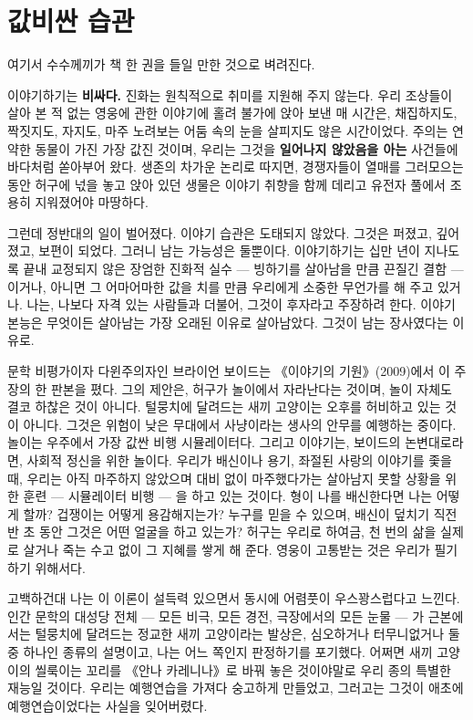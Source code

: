 \section*{값비싼 습관}

여기서 수수께끼가 책 한 권을 들일 만한 것으로 벼려진다.

이야기하기는 \textbf{비싸다.} 진화는 원칙적으로 취미를 지원해 주지 않는다. 우리 조상들이 살아 본 적 없는 영웅에 관한 이야기에 홀려 불가에 앉아 보낸 매 시간은, 채집하지도, 짝짓지도, 자지도, 마주 노려보는 어둠 속의 눈을 살피지도 않은 시간이었다. 주의는 연약한 동물이 가진 가장 값진 것이며, 우리는 그것을 \textbf{일어나지 않았음을 아는} 사건들에 바다처럼 쏟아부어 왔다. 생존의 차가운 논리로 따지면, 경쟁자들이 열매를 그러모으는 동안 허구에 넋을 놓고 앉아 있던 생물은 이야기 취향을 함께 데리고 유전자 풀에서 조용히 지워졌어야 마땅하다.

그런데 정반대의 일이 벌어졌다. 이야기 습관은 도태되지 않았다. 그것은 퍼졌고, 깊어졌고, 보편이 되었다. 그러니 남는 가능성은 둘뿐이다. 이야기하기는 십만 년이 지나도록 끝내 교정되지 않은 장엄한 진화적 실수 — 빙하기를 살아남을 만큼 끈질긴 결함 — 이거나, 아니면 그 어마어마한 값을 치를 만큼 우리에게 소중한 무언가를 해 주고 있거나. 나는, 나보다 자격 있는 사람들과 더불어, 그것이 후자라고 주장하려 한다. 이야기 본능은 무엇이든 살아남는 가장 오래된 이유로 살아남았다. 그것이 남는 장사였다는 이유로.

문학 비평가이자 다윈주의자인 브라이언 보이드는 《이야기의 기원》(2009)에서 이 주장의 한 판본을 폈다. 그의 제안은, 허구가 놀이에서 자라난다는 것이며, 놀이 자체도 결코 하찮은 것이 아니다. 털뭉치에 달려드는 새끼 고양이는 오후를 허비하고 있는 것이 아니다. 그것은 위험이 낮은 무대에서 사냥이라는 생사의 안무를 예행하는 중이다. 놀이는 우주에서 가장 값싼 비행 시뮬레이터다. 그리고 이야기는, 보이드의 논변대로라면, 사회적 정신을 위한 놀이다. 우리가 배신이나 용기, 좌절된 사랑의 이야기를 좇을 때, 우리는 아직 마주하지 않았으며 대비 없이 마주했다가는 살아남지 못할 상황을 위한 훈련 — 시뮬레이터 비행 — 을 하고 있는 것이다. 형이 나를 배신한다면 나는 어떻게 할까? 겁쟁이는 어떻게 용감해지는가? 누구를 믿을 수 있으며, 배신이 덮치기 직전 반 초 동안 그것은 어떤 얼굴을 하고 있는가? 허구는 우리로 하여금, 천 번의 삶을 실제로 살거나 죽는 수고 없이 그 지혜를 쌓게 해 준다. 영웅이 고통받는 것은 우리가 필기하기 위해서다.

고백하건대 나는 이 이론이 설득력 있으면서 동시에 어렴풋이 우스꽝스럽다고 느낀다. 인간 문학의 대성당 전체 — 모든 비극, 모든 경전, 극장에서의 모든 눈물 — 가 근본에서는 털뭉치에 달려드는 정교한 새끼 고양이라는 발상은, 심오하거나 터무니없거나 둘 중 하나인 종류의 설명이고, 나는 어느 쪽인지 판정하기를 포기했다. 어쩌면 새끼 고양이의 씰룩이는 꼬리를 《안나 카레니나》로 바꿔 놓은 것이야말로 우리 종의 특별한 재능일 것이다. 우리는 예행연습을 가져다 숭고하게 만들었고, 그러고는 그것이 애초에 예행연습이었다는 사실을 잊어버렸다.

